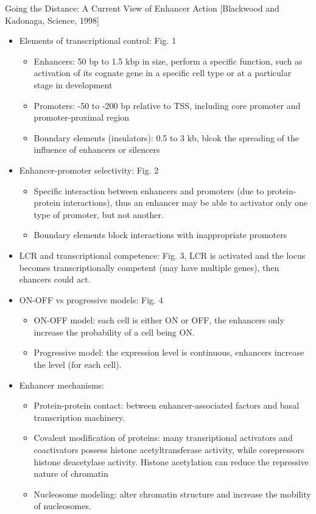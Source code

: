 \documentclass{report}
\begin{document}
Going the Distance: A Current View of Enhancer Action [Blackwood and Kadonaga, Science, 1998]
\begin{itemize}
	\item Elements of transcriptional control: Fig. 1
	\begin{itemize}
		\item Enhancers: 50 bp to 1.5 kbp in size, perform a specific function, such as activation of its cognate gene in a specific cell type or at a particular stage in development
		\item Promoters: -50 to -200 bp relative to TSS, including core promoter and promoter-proximal region
		\item Boundary elements (insulators): 0.5 to 3 kb, blcok the spreading of the influence of enhancers or silencers
	\end{itemize}
	
	\item Enhancer-promoter selectivity: Fig. 2
	\begin{itemize}
		\item Specific interaction between enhancers and promoters (due to protein-protein interactions), thus an enhancer may be able to activator only one type of promoter, but not another. 
		\item Boundary elements block interactions with inappropriate promoters
	\end{itemize}
	
	\item LCR and transcriptional competence: Fig. 3, LCR is activated and the locus becomes transcriptionally competent (may have multiple genes), then ehancers could act. 
	
	\item ON-OFF vs progressive models: Fig. 4
	\begin{itemize}
		\item ON-OFF model: each cell is either ON or OFF, the enhancers only increase the probability of a cell being ON. 
		\item Progressive model: the expression level is continuous, enhancers increase the level (for each cell). 
	\end{itemize}
	
	\item Enhancer mechanisms:
	\begin{itemize}
		\item Protein-protein contact: between enhancer-associated factors and basal transcription machinery. 
		\item Covalent modification of proteins: many transriptional activators and coactivators possess histone acetyltransferase activity, while corepressors histone deacetylase activity. Histone acetylation can reduce the repressive nature of chromatin
		\item Nucleosome modeling: alter chromatin structure and increase the mobility of nucleosomes. 
	\end{itemize}
	

\end{itemize}
\end{document}
